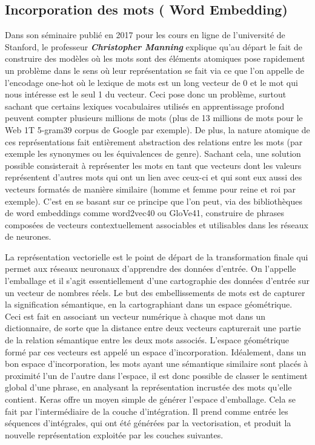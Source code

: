 \subsection{Incorporation des mots ( Word Embedding)}
Dans son séminaire publié en 2017 pour les cours en ligne de l’université de Stanford, le professeur \textbf{\textit{Christopher Manning}} explique qu’au départ le fait de construire des modèles où les mots sont des éléments atomiques pose rapidement un problème dans le sens où leur représentation se fait via ce que l’on appelle de l’encodage one-hot où le lexique de mots est un long vecteur de 0 et le mot qui nous intéresse est le seul 1 du vecteur. Ceci pose donc un problème, surtout sachant que certains lexiques vocabulaires utilisés en apprentissage profond peuvent compter plusieurs millions de mots (plus de 13 millions de mots pour le Web 1T 5-gram39 corpus de Google par exemple). De plus, la nature atomique de ces représentations fait entièrement abstraction des relations entre les mots (par exemple les synonymes ou les équivalences de genre). Sachant cela, une solution possible consisterait à représenter les mots en tant que vecteurs dont les valeurs représentent d’autres mots qui ont un lien avec ceux-ci et qui sont eux aussi des vecteurs formatés de manière similaire (homme et femme pour reine et roi par exemple). C’est en se basant sur ce principe que l’on peut, via des bibliothèques de word embeddings comme word2vec40 ou GloVe41, construire de phrases composées de vecteurs contextuellement associables et utilisables dans les réseaux de neurones.

La représentation vectorielle est le point de départ de la transformation finale qui permet aux réseaux neuronaux d'apprendre des données d'entrée. On l'appelle l'emballage et il s'agit essentiellement d'une cartographie des données d'entrée sur un vecteur de nombres réels.
Le but des embellissements de mots est de capturer la signification sémantique, en la cartographiant dans un espace géométrique. Ceci est fait en associant un vecteur numérique à chaque mot dans un dictionnaire, de sorte que la distance entre deux vecteurs capturerait une partie de la relation sémantique entre les deux mots associés. L'espace géométrique formé par ces vecteurs est appelé un espace d'incorporation. Idéalement, dans un bon espace d'incorporation, les mots ayant une sémantique similaire sont placés à proximité l'un de l'autre dans l'espace, il est donc possible de classer le sentiment global d'une phrase, en analysant la représentation incrustée des mots qu'elle contient.
Keras offre un moyen simple de générer l'espace d'emballage. Cela se fait par l'intermédiaire de la couche d'intégration. Il prend comme entrée les séquences d'intégrales, qui ont été générées par la vectorisation, et produit la nouvelle représentation exploitée par les couches suivantes.

